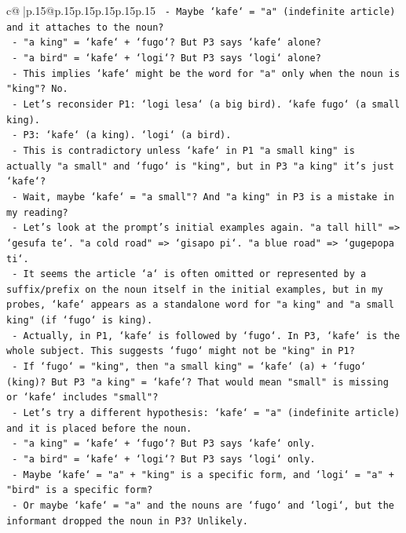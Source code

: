 \documentclass{article}
\begin{document}
{\begin{supertabular}{c@{$\;$}|p{.15\linewidth}@{}p{.15\linewidth}p{.15\linewidth}p{.15\linewidth}p{.15\linewidth}p{.15\linewidth}}
{{{\texttt{      {-} Maybe `kafe` = "a" (indefinite article) and it attaches to the noun?} \\
\texttt{        {-} "a king" = `kafe` + `fugo`? But P3 says `kafe` alone?} \\
\texttt{        {-} "a bird" = `kafe` + `logi`? But P3 says `logi` alone?} \\
\texttt{      {-} This implies `kafe` might be the word for "a" only when the noun is "king"? No.} \\
\texttt{      {-} Let's reconsider P1: `logi lesa` (a big bird). `kafe fugo` (a small king).} \\
\texttt{      {-} P3: `kafe` (a king). `logi` (a bird).} \\
\texttt{      {-} This is contradictory unless `kafe` in P1 "a small king" is actually "a small" and `fugo` is "king", but in P3 "a king" it's just `kafe`?} \\
\texttt{      {-} Wait, maybe `kafe` = "a small"? And "a king" in P3 is a mistake in my reading?} \\
\texttt{      {-} Let's look at the prompt's initial examples again. "a tall hill" => `gesufa te`. "a cold road" => `gisapo pi`. "a blue road" => `gugepopa ti`.} \\
\texttt{      {-} It seems the article `a` is often omitted or represented by a suffix/prefix on the noun itself in the initial examples, but in my probes, `kafe` appears as a standalone word for "a king" and "a small king" (if `fugo` is king).} \\
\texttt{      {-} Actually, in P1, `kafe` is followed by `fugo`. In P3, `kafe` is the whole subject. This suggests `fugo` might not be "king" in P1?} \\
\texttt{      {-} If `fugo` = "king", then "a small king" = `kafe` (a) + `fugo` (king)? But P3 "a king" = `kafe`? That would mean "small" is missing or `kafe` includes "small"?} \\
\texttt{      {-} Let's try a different hypothesis: `kafe` = "a" (indefinite article) and it is placed before the noun.} \\
\texttt{        {-} "a king" = `kafe` + `fugo`? But P3 says `kafe` only.} \\
\texttt{        {-} "a bird" = `kafe` + `logi`? But P3 says `logi` only.} \\
\texttt{      {-} Maybe `kafe` = "a" + "king" is a specific form, and `logi` = "a" + "bird" is a specific form?} \\
\texttt{      {-} Or maybe `kafe` = "a" and the nouns are `fugo` and `logi`, but the informant dropped the noun in P3? Unlikely.} \\
}}}
\end{supertabular}}
\end{document}

